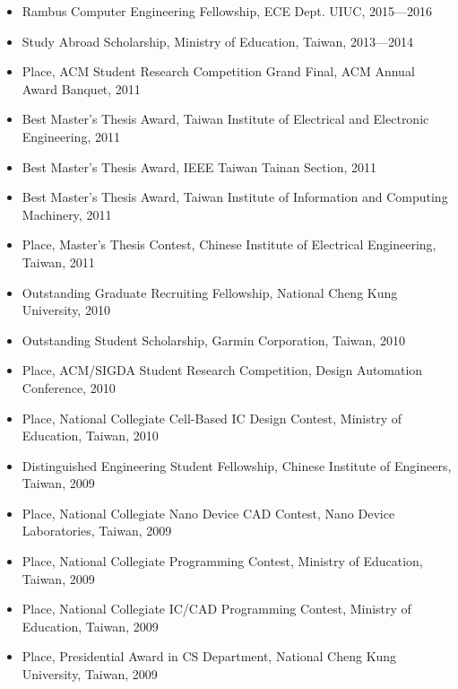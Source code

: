 \documentclass[A4,11pt]{article}
\begin{document}
\begin{itemize}
    \item Rambus Computer Engineering Fellowship, ECE Dept. UIUC, 2015—2016
    \item Study Abroad Scholarship, Ministry of Education, Taiwan, 2013—2014
    \item {} Place, ACM Student Research Competition Grand Final, ACM Annual Award Banquet, 2011
    \item Best Master’s Thesis Award, Taiwan Institute of Electrical and Electronic Engineering, 2011
    \item Best Master’s Thesis Award, IEEE Taiwan Tainan Section, 2011
    \item Best Master’s Thesis Award, Taiwan Institute of Information and Computing Machinery, 2011
    \item {} Place, Master’s Thesis Contest, Chinese Institute of Electrical Engineering, Taiwan, 2011
    \item Outstanding Graduate Recruiting Fellowship, National Cheng Kung University, 2010
    \item Outstanding Student Scholarship, Garmin Corporation, Taiwan, 2010
    \item {} Place, ACM/SIGDA Student Research Competition, Design Automation Conference, 2010
    \item {} Place, National Collegiate Cell-Based IC Design Contest, Ministry of Education, Taiwan, 2010
    \item Distinguished Engineering Student Fellowship, Chinese Institute of Engineers, Taiwan, 2009
    \item {} Place, National Collegiate Nano Device CAD Contest, Nano Device Laboratories, Taiwan, 2009
    \item {} Place, National Collegiate Programming Contest, Ministry of Education, Taiwan, 2009
    \item {} Place, National Collegiate IC/CAD Programming Contest, Ministry of Education, Taiwan, 2009
    \item {} Place, Presidential Award in CS Department, National Cheng Kung University, Taiwan, 2009

 \end{itemize}

\end{document}
